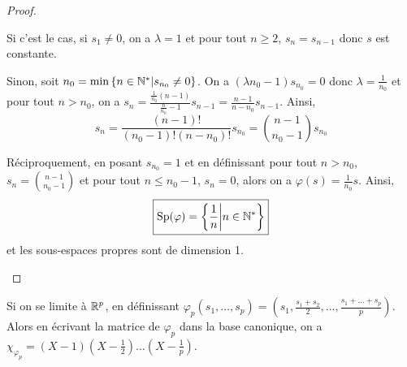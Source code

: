 \documentclass[12pt]{article}
\begin{document}
\begin{proof}
\begin{enumerate}
		Si c'est le cas, si $s_{1}\neq0$, on a $\lambda=1$ et pour tout $n\geqslant2$, $s_{n}=s_{n-1}$ donc $s$ est constante.

		Sinon, soit $n_{0}=\min\left\lbrace n\in\mathbb{N}^{*}\middle| s_{n_{0}}\neq0\right\rbrace$. On a $(\lambda n_{0}-1)s_{n_{0}}=0$ donc $\lambda=\frac{1}{n_{0}}$ et pour tout $n> n_{0}$, on a $s_{n}=\frac{\frac{1}{n_{0}}(n-1)}{\frac{n}{n_{0}}-1}s_{n-1}=\frac{n-1}{n-n_{0}}s_{n-1}$. Ainsi, 
		\begin{equation}
			s_{n}=\frac{(n-1)!}{(n_{0}-1)!(n-n_{0})!}s_{n_{0}}=\binom{n-1}{n_{0}-1}s_{n_{0}}
		\end{equation}

		Réciproquement, en posant $s_{n_{0}}=1$ et en définissant pour tout $n>n_{0}$, $s_{n}=\binom{n-1}{n_{0}-1}$ et pour tout $n\leqslant n_{0}-1$, $s_{n}=0$, alors on a $\varphi(s)=\frac{1}{n_{0}}s$. Ainsi, 
		\begin{equation}
			\boxed{
				\operatorname{Sp}(\varphi)=\left\lbrace\frac{1}{n}\middle| n\in\mathbb{N}^{*}\right\rbrace
			}
		\end{equation}
		et les sous-espaces propres sont de dimension 1.
	\end{enumerate}
\end{proof}

\begin{remark}
	Si on se limite à $\mathbb{R}^{p}$, en définissant $\varphi_{p}(s_{1},\dots,s_{p})=(s_{1},\frac{s_{1}+s_{2}}{2},\dots,\frac{s_{1}+\dots+s_{p}}{p})$. Alors en écrivant la matrice de $\varphi_{p}$ dans la base canonique, on a $\chi_{\varphi_{p}}=(X-1)(X-\frac{1}{2})\dots(X-\frac{1}{p})$.
\end{remark}
\end{document}
